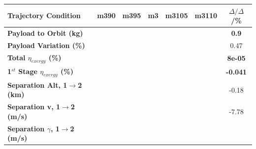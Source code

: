 \begin{table}[ht]
	\centering
	
	\begin{tabular}{l c c c c c c} 
		\hline \textbf{Trajectory Condition}
		&m390
		&m395
		&m3
		&m3105
		&m3110
		& $\Delta/\Delta$/\%
		\\
		\hline \textbf{Payload to Orbit (kg)}
		& \textbf{\PayloadToOrbitmThreeNinetyNoReturn}
		& \textbf{\PayloadToOrbitmThreeNinetyFiveNoReturn}
		& \textbf{\PayloadToOrbitmThreeStandardNoReturn}
		& \textbf{\PayloadToOrbitmThreeOneHundredFiveNoReturn}
		& \textbf{\PayloadToOrbitmThreeOneHundredTenNoReturn}
		&\textbf{0.9}
		\\
		\textbf{Payload Variation (\%)}
		& \PayloadVarmThreeNinetyNoReturn
		& \PayloadVarmThreeNinetyFiveNoReturn
		& \PayloadVarmThreeStandardNoReturn
		& \PayloadVarmThreeOneHundredFiveNoReturn
		& \PayloadVarmThreeOneHundredTenNoReturn
		&0.47
		\\
		\textbf{Total $\eta_{exergy}$ (\%)}
		& \textbf{\totalExergyEffmThreeNinetyNoReturn}
		& \textbf{\totalExergyEffmThreeNinetyFiveNoReturn}
		& \textbf{\totalExergyEffmThreeStandardNoReturn}
		& \textbf{\totalExergyEffmThreeOneHundredFiveNoReturn}
		& \textbf{\totalExergyEffmThreeOneHundredTenNoReturn}
		& \textbf{8e-05}
		\\
		\hline 
		\textbf{1$^{st}$ Stage $\eta_{exergy}$ (\%)}
		& \textbf{\firstExergyEffmThreeNinetyNoReturn}
		& \textbf{\firstExergyEffmThreeNinetyFiveNoReturn}
		& \textbf{\firstExergyEffmThreeStandardNoReturn}
		& \textbf{\firstExergyEffmThreeOneHundredFiveNoReturn}
		& \textbf{\firstExergyEffmThreeOneHundredTenNoReturn}
		& \textbf{-0.041}
		\\
		\textbf{Separation Alt, 1$\rightarrow$2 (km)}
		& \firstsecondSeparationAltmThreeNinetyNoReturn
		& \firstsecondSeparationAltmThreeNinetyFiveNoReturn
		& \firstsecondSeparationAltmThreeStandardNoReturn
		& \firstsecondSeparationAltmThreeOneHundredFiveNoReturn
		& \firstsecondSeparationAltmThreeOneHundredTenNoReturn
		&-0.18
		\\
		\textbf{Separation v, 1$\rightarrow$2 (m/s)}
		& \firstsecondSeparationvmThreeNinetyNoReturn
		& \firstsecondSeparationvmThreeNinetyFiveNoReturn
		& \firstsecondSeparationvmThreeStandardNoReturn
		& \firstsecondSeparationvmThreeOneHundredFiveNoReturn
		& \firstsecondSeparationvmThreeOneHundredTenNoReturn
		&-7.78
		\\
		\textbf{Separation $\gamma$, 1$\rightarrow$2 (m/s)}
		& \firstsecondSeparationgammamThreeNinetyNoReturn
		& \firstsecondSeparationgammamThreeNinetyFiveNoReturn

\end{tabular}
\end{table}
